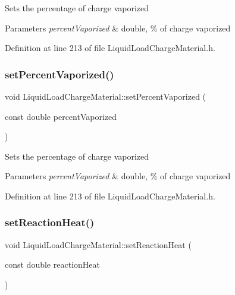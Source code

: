 Sets the percentage of charge vaporized 
\begin{DoxyParams}{Parameters}
{\em percent\+Vaporized} & double, \% of charge vaporized \\
\hline
\end{DoxyParams}


Definition at line 213 of file Liquid\+Load\+Charge\+Material.\+h.

\mbox{\label{class_liquid_load_charge_material_aaf2aa3303201370a7b79e5b3f54e135a}} 
\subsubsection{\texorpdfstring{set\+Percent\+Vaporized()}{setPercentVaporized()}\hspace{0.1cm}{\footnotesize\ttfamily [3/3]}}
{\footnotesize\ttfamily void Liquid\+Load\+Charge\+Material\+::set\+Percent\+Vaporized (\begin{DoxyParamCaption}\item[{const double}]{percent\+Vaporized }\end{DoxyParamCaption})\hspace{0.3cm}{\ttfamily [inline]}}

Sets the percentage of charge vaporized 
\begin{DoxyParams}{Parameters}
{\em percent\+Vaporized} & double, \% of charge vaporized \\
\hline
\end{DoxyParams}


Definition at line 213 of file Liquid\+Load\+Charge\+Material.\+h.

\mbox{\label{class_liquid_load_charge_material_a793c7ebc2643b2af0eaf21b9cb788775}} 
\subsubsection{\texorpdfstring{set\+Reaction\+Heat()}{setReactionHeat()}\hspace{0.1cm}{\footnotesize\ttfamily [1/3]}}
{\footnotesize\ttfamily void Liquid\+Load\+Charge\+Material\+::set\+Reaction\+Heat (\begin{DoxyParamCaption}\item[{const double}]{reaction\+Heat }\end{DoxyParamCaption})\hspace{0.3cm}{\ttfamily [inline]}}

